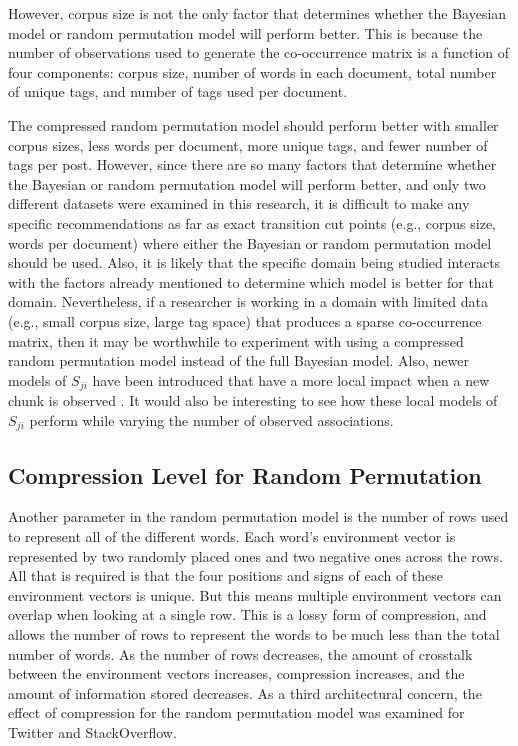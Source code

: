 \documentclass[man,floatsintext,donotrepeattitle]{apa6}
\begin{document}
However, corpus size is not the only factor that determines whether the Bayesian model or random permutation model will perform better.
This is because the number of observations used to generate the co-occurrence matrix is a function of four components:
corpus size, number of words in each document, total number of unique tags, and number of tags used per document.

The compressed random permutation model should perform better with smaller corpus sizes, less words per document, more unique tags, and fewer number of tags per post.
However, since there are so many factors that determine whether the Bayesian or random permutation model will perform better,
and only two different datasets were examined in this research,
it is difficult to make any specific recommendations as far as exact transition cut points (e.g., corpus size, words per document) where either the Bayesian or random permutation model should be used.
Also, it is likely that the specific domain being studied interacts with the factors already mentioned to determine which model is better for that domain.
Nevertheless, if a researcher is working in a domain with limited data (e.g., small corpus size, large tag space) that produces a sparse co-occurrence matrix,
then it may be worthwhile to experiment with using a compressed random permutation model instead of the full Bayesian model.
Also, newer models of $S_{ji}$ have been introduced that have a more local impact when a new chunk is observed \parencite{thomson2013constraining}.
It would also be interesting to see how these local models of $S_{ji}$ perform while varying the number of observed associations.

\subsection{Compression Level for Random Permutation}

Another parameter in the random permutation model is the number of rows used to represent all of the different words.
Each word's environment vector is represented by two randomly placed ones and two negative ones across the rows.
All that is required is that the four positions and signs of each of these environment vectors is unique.
But this means multiple environment vectors can overlap when looking at a single row.
This is a lossy form of compression, and allows the number of rows to represent the words to be much less than the total number of words.
As the number of rows decreases, the amount of crosstalk between the environment vectors increases, compression increases, and the amount of information stored decreases.
As a third architectural concern, the effect of compression for the random permutation model was examined for Twitter and StackOverflow.
\end{document}
